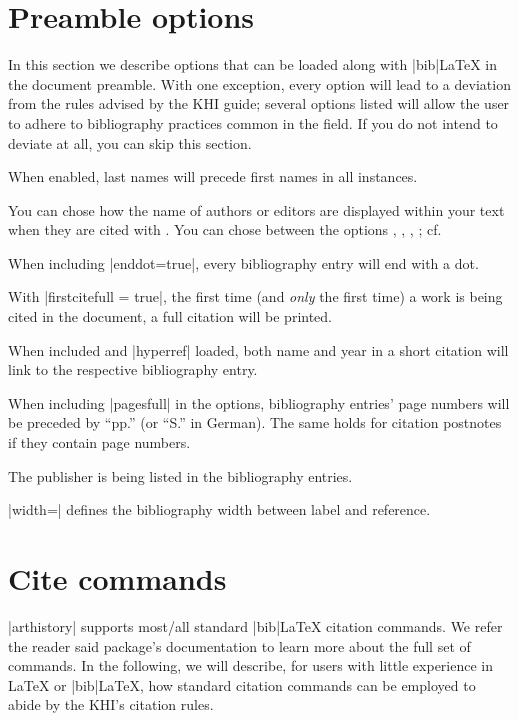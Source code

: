 \documentclass[a4paper,
10pt,
ngerman,
english
]{ltxdoc}
\begin{document}
\section{Preamble options}\label{preamble_options}
In this section we describe options that can be loaded along with |bib|\LaTeX{} in the document preamble. With one exception, every option will lead to a deviation from the rules advised by the KHI guide; several options listed will allow the user to adhere to bibliography practices common in the field. If you do not intend to deviate at all, you can skip this section.

When enabled, last names will precede first names in all instances.

You can chose how the name of authors or editors are displayed within your text when they are cited with .
You can chose between the options , , , ; 
cf. %

When including |enddot=true|, every bibliography entry will end with a dot.

With |firstcitefull = true|, the first time (and \emph{only} the first time) a work is being cited in the document, a full citation will be printed.

When included and |hyperref| loaded, both name and year in a short citation will link to the respective bibliography entry.

When including |pagesfull| in the options, bibliography entries' page numbers will be preceded by \enquote{pp.} (or \enquote{S.} in German). The same holds for citation postnotes if they contain page numbers.

The publisher is being listed in the bibliography entries.

|width=| defines the bibliography width between label and reference.


\section{Cite commands}\label{cite-commands}
|arthistory| supports most/all standard |bib|\LaTeX{} citation commands. We refer the reader said package's documentation to learn more about the full set of commands. In the following, we will describe, for users with little experience in \LaTeX{} or |bib|\LaTeX, how standard citation commands can be employed to abide by the KHI's citation rules.
\end{document}
